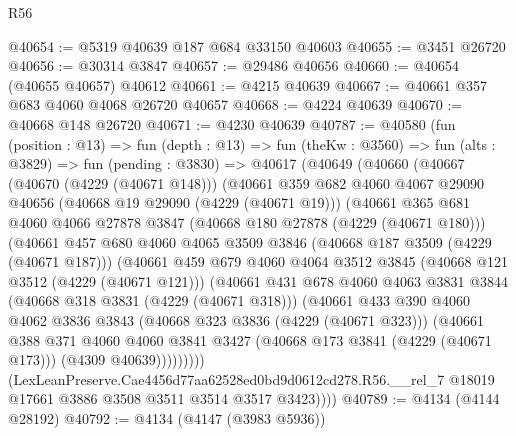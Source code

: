 \begin{lexlean}{R56}
\begin{coremodule}
@40654 := @5319 @40639 @187 @684 @33150 @40603
@40655 := @3451 @26720
@40656 := @30314 @3847
@40657 := @29486 @40656
@40660 := @40654 (@40655 @40657) @40612
@40661 := @4215 @40639
@40667 := @40661 @357 @683 @4060 @4068 @26720 @40657
@40668 := @4224 @40639
@40670 := @40668 @148 @26720
@40671 := @4230 @40639
@40787 := @40580
    (fun (position : @13) =>
    fun (depth : @13) =>
    fun (theKw : @3560) =>
    fun (alts : @3829) =>
    fun (pending : @3830) =>
    @40617
      (@40649
        (@40660
          (@40667
            (@40670 (@4229 (@40671 @148)))
            (@40661
              @359
              @682
              @4060
              @4067
              @29090
              @40656
              (@40668 @19 @29090 (@4229 (@40671 @19)))
              (@40661
                @365
                @681
                @4060
                @4066
                @27878
                @3847
                (@40668 @180 @27878 (@4229 (@40671 @180)))
                (@40661
                  @457
                  @680
                  @4060
                  @4065
                  @3509
                  @3846
                  (@40668 @187 @3509 (@4229 (@40671 @187)))
                  (@40661
                    @459
                    @679
                    @4060
                    @4064
                    @3512
                    @3845
                    (@40668 @121 @3512 (@4229 (@40671 @121)))
                    (@40661
                      @431
                      @678
                      @4060
                      @4063
                      @3831
                      @3844
                      (@40668 @318 @3831 (@4229 (@40671 @318)))
                      (@40661
                        @433
                        @390
                        @4060
                        @4062
                        @3836
                        @3843
                        (@40668 @323 @3836 (@4229 (@40671 @323)))
                        (@40661
                          @388
                          @371
                          @4060
                          @4060
                          @3841
                          @3427
                          (@40668 @173 @3841 (@4229 (@40671 @173)))
                          (@4309 @40639)))))))))
          (LexLeanPreserve.Cae4456d77aa62528ed0bd9d0612cd278.R56.__rel_7
            @18019
            @17661
            @3886
            @3508
            @3511
            @3514
            @3517
            @3423))))
@40789 := @4134 (@4144 @28192)
@40792 := @4134 (@4147 (@3983 @5936))

\end{coremodule}
\end{lexlean}
